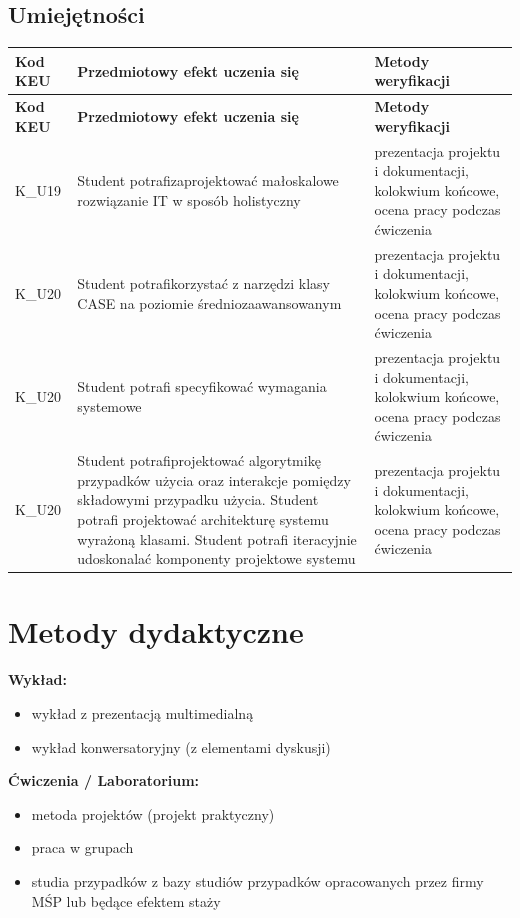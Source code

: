\documentclass[12pt, a4paper]{article}
\newcommand{\thdrule}{\noalign{\global\setlength{\extrarowheight}{0pt}}}
\newcommand{\thdend}{\noalign{\global\setlength{\extrarowheight}{3pt}}}
\begin{document}
\subsection*{Umiejętności}
{\scriptsize
\begin{longtable}{m{1.6cm}m{9.0cm}m{4.2cm}}
\thdrule\toprule
\rowcolor{pjatkRed} {\color{white}\footnotesize\textbf{\vphantom{Ag}Kod KEU}} & {\color{white}\footnotesize\textbf{\vphantom{Ag}Przedmiotowy efekt uczenia się}} & {\color{white}\footnotesize\textbf{\vphantom{Ag}Metody weryfikacji}} \\
\midrule\thdend
\endfirsthead
\thdrule\toprule
\rowcolor{pjatkRed} {\color{white}\footnotesize\textbf{\vphantom{Ag}Kod KEU}} & {\color{white}\footnotesize\textbf{\vphantom{Ag}Przedmiotowy efekt uczenia się}} & {\color{white}\footnotesize\textbf{\vphantom{Ag}Metody weryfikacji}} \\
\midrule\thdend
\endhead
  \rowcolor{tableRowLight} K\_U19 & Student potrafizaprojektować małoskalowe rozwiązanie IT w sposób holistyczny & prezentacja projektu i dokumentacji, kolokwium końcowe, ocena pracy podczas ćwiczenia \\
  \rowcolor{tableRowAlt} K\_U20 & Student potrafikorzystać z narzędzi klasy CASE na poziomie średniozaawansowanym & prezentacja projektu i dokumentacji, kolokwium końcowe, ocena pracy podczas ćwiczenia \\
  \rowcolor{tableRowLight} K\_U20 & Student potrafi specyfikować wymagania systemowe & prezentacja projektu i dokumentacji, kolokwium końcowe, ocena pracy podczas ćwiczenia \\
  \rowcolor{tableRowAlt} K\_U20 & Student potrafiprojektować algorytmikę przypadków użycia oraz interakcje pomiędzy składowymi przypadku użycia. Student potrafi projektować architekturę systemu wyrażoną klasami. Student potrafi iteracyjnie udoskonalać komponenty projektowe systemu & prezentacja projektu i dokumentacji, kolokwium końcowe, ocena pracy podczas ćwiczenia \\
\bottomrule
\end{longtable}}

\section{Metody dydaktyczne}

\textbf{Wykład:}
\begin{itemize}
  \item wykład z prezentacją multimedialną
  \item wykład konwersatoryjny (z elementami dyskusji)
\end{itemize}
\vspace{4pt}
\textbf{Ćwiczenia / Laboratorium:}
\begin{itemize}
  \item metoda projektów (projekt praktyczny)
  \item praca w grupach
  \item studia przypadków z bazy studiów przypadków opracowanych przez firmy MŚP lub będące efektem staży
\end{itemize}
\vspace{4pt}
\end{document}
